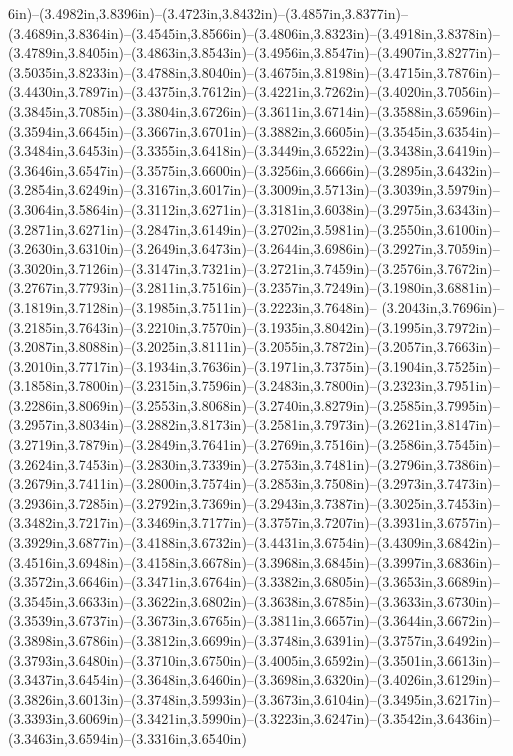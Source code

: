 6in)--(3.4982in,3.8396in)--(3.4723in,3.8432in)--(3.4857in,3.8377in)--(3.4689in,3.8364in)--(3.4545in,3.8566in)--(3.4806in,3.8323in)--(3.4918in,3.8378in)--(3.4789in,3.8405in)--(3.4863in,3.8543in)--(3.4956in,3.8547in)--(3.4907in,3.8277in)--(3.5035in,3.8233in)--(3.4788in,3.8040in)--(3.4675in,3.8198in)--(3.4715in,3.7876in)--(3.4430in,3.7897in)--(3.4375in,3.7612in)--(3.4221in,3.7262in)--(3.4020in,3.7056in)--(3.3845in,3.7085in)--(3.3804in,3.6726in)--(3.3611in,3.6714in)--(3.3588in,3.6596in)--(3.3594in,3.6645in)--(3.3667in,3.6701in)--(3.3882in,3.6605in)--(3.3545in,3.6354in)--(3.3484in,3.6453in)--(3.3355in,3.6418in)--(3.3449in,3.6522in)--(3.3438in,3.6419in)--(3.3646in,3.6547in)--(3.3575in,3.6600in)--(3.3256in,3.6666in)--(3.2895in,3.6432in)--(3.2854in,3.6249in)--(3.3167in,3.6017in)--(3.3009in,3.5713in)--(3.3039in,3.5979in)--(3.3064in,3.5864in)--(3.3112in,3.6271in)--(3.3181in,3.6038in)--(3.2975in,3.6343in)--(3.2871in,3.6271in)--(3.2847in,3.6149in)--(3.2702in,3.5981in)--(3.2550in,3.6100in)--(3.2630in,3.6310in)--(3.2649in,3.6473in)--(3.2644in,3.6986in)--(3.2927in,3.7059in)--(3.3020in,3.7126in)--(3.3147in,3.7321in)--(3.2721in,3.7459in)--(3.2576in,3.7672in)--(3.2767in,3.7793in)--(3.2811in,3.7516in)--(3.2357in,3.7249in)--(3.1980in,3.6881in)--(3.1819in,3.7128in)--(3.1985in,3.7511in)--(3.2223in,3.7648in)--
(3.2043in,3.7696in)--(3.2185in,3.7643in)--(3.2210in,3.7570in)--(3.1935in,3.8042in)--(3.1995in,3.7972in)--(3.2087in,3.8088in)--(3.2025in,3.8111in)--(3.2055in,3.7872in)--(3.2057in,3.7663in)--(3.2010in,3.7717in)--(3.1934in,3.7636in)--(3.1971in,3.7375in)--(3.1904in,3.7525in)--(3.1858in,3.7800in)--(3.2315in,3.7596in)--(3.2483in,3.7800in)--(3.2323in,3.7951in)--(3.2286in,3.8069in)--(3.2553in,3.8068in)--(3.2740in,3.8279in)--(3.2585in,3.7995in)--(3.2957in,3.8034in)--(3.2882in,3.8173in)--(3.2581in,3.7973in)--(3.2621in,3.8147in)--(3.2719in,3.7879in)--(3.2849in,3.7641in)--(3.2769in,3.7516in)--(3.2586in,3.7545in)--(3.2624in,3.7453in)--(3.2830in,3.7339in)--(3.2753in,3.7481in)--(3.2796in,3.7386in)--(3.2679in,3.7411in)--(3.2800in,3.7574in)--(3.2853in,3.7508in)--(3.2973in,3.7473in)--(3.2936in,3.7285in)--(3.2792in,3.7369in)--(3.2943in,3.7387in)--(3.3025in,3.7453in)--(3.3482in,3.7217in)--(3.3469in,3.7177in)--(3.3757in,3.7207in)--(3.3931in,3.6757in)--(3.3929in,3.6877in)--(3.4188in,3.6732in)--(3.4431in,3.6754in)--(3.4309in,3.6842in)--(3.4516in,3.6948in)--(3.4158in,3.6678in)--(3.3968in,3.6845in)--(3.3997in,3.6836in)--(3.3572in,3.6646in)--(3.3471in,3.6764in)--(3.3382in,3.6805in)--(3.3653in,3.6689in)--(3.3545in,3.6633in)--(3.3622in,3.6802in)--(3.3638in,3.6785in)--(3.3633in,3.6730in)--(3.3539in,3.6737in)--(3.3673in,3.6765in)--(3.3811in,3.6657in)--(3.3644in,3.6672in)--(3.3898in,3.6786in)--(3.3812in,3.6699in)--(3.3748in,3.6391in)--(3.3757in,3.6492in)--(3.3793in,3.6480in)--(3.3710in,3.6750in)--(3.4005in,3.6592in)--(3.3501in,3.6613in)--(3.3437in,3.6454in)--(3.3648in,3.6460in)--(3.3698in,3.6320in)--(3.4026in,3.6129in)--(3.3826in,3.6013in)--(3.3748in,3.5993in)--(3.3673in,3.6104in)--(3.3495in,3.6217in)--(3.3393in,3.6069in)--(3.3421in,3.5990in)--(3.3223in,3.6247in)--(3.3542in,3.6436in)--(3.3463in,3.6594in)--(3.3316in,3.6540in)

